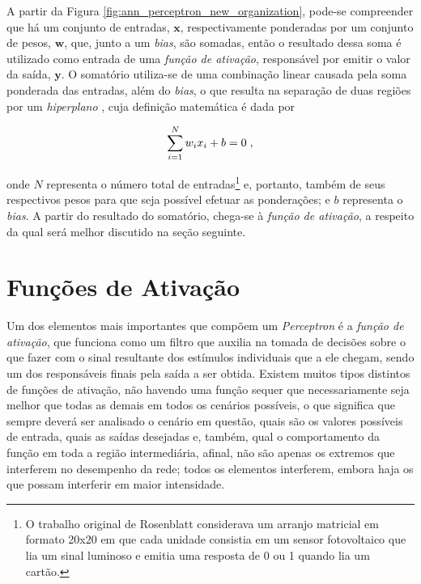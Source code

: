 A partir da Figura \ref{fig:ann_perceptron_new_organization}, pode-se compreender que há um conjunto de entradas, $\bm{x}$, respectivamente ponderadas por um conjunto de pesos, $\bm{w}$, que, junto a um \textit{bias}, são somadas, então o resultado dessa soma é utilizado como entrada de uma \textit{função de ativação}, responsável por emitir o valor da saída, $\bm{y}$. O somatório utiliza-se de uma combinação linear causada pela soma ponderada das entradas, além do \textit{bias}, o que resulta na separação de duas regiões por um \textit{hiperplano} \citep{haykin1999neural}, cuja definição matemática é dada por

\begin{equation}
    \sum_{i=1}^{N} w_{i} x_{i} + b = 0
    \label{eq:ann_perceptron_hyperplane}
    \hspace{0.1cm},
    \vspace{0.2cm}
\end{equation}

\noindent onde $N$ representa o número total de entradas\footnote{O trabalho original de Rosenblatt considerava um arranjo matricial em formato 20x20 em que cada unidade consistia em um sensor fotovoltaico que lia um sinal luminoso e emitia uma resposta de 0 ou 1 quando lia um cartão.} e, portanto, também de seus respectivos pesos para que seja possível efetuar as ponderações; e $b$ representa o \textit{bias}. A partir do resultado do somatório, chega-se à \textit{função de ativação}, a respeito da qual será melhor discutido na seção seguinte.



\section{Funções de Ativação}
\label{sec:ann_activation_functions}

Um dos elementos mais importantes que compõem um \textit{Perceptron} é a \textit{função de ativação}, que funciona como um filtro que auxilia na tomada de decisões sobre o que fazer com o sinal resultante dos estímulos individuais que a ele chegam, sendo um dos responsáveis finais pela saída a ser obtida. Existem muitos tipos distintos de funções de ativação, não havendo uma função sequer que necessariamente seja melhor que todas as demais em todos os cenários possíveis, o que significa que sempre deverá ser analisado o cenário em questão, quais são os valores possíveis de entrada, quais as saídas desejadas e, também, qual o comportamento da função em toda a região intermediária, afinal, não são apenas os extremos que interferem no desempenho da rede; todos os elementos interferem, embora haja os que possam interferir em maior intensidade.

